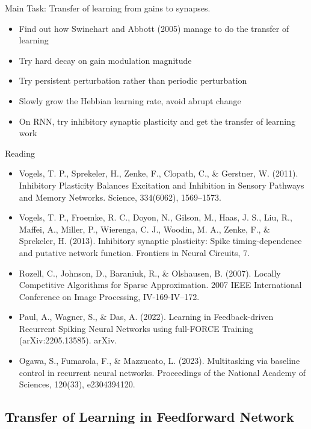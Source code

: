 \documentclass[12pt, a4paper]{article}
\begin{document}
\noindent
Main Task: Transfer of learning from gains to synapses.

\begin{itemize}
    \item Find out how Swinehart and Abbott (2005) manage to do the transfer of learning
    \item Try hard decay on gain modulation magnitude
    \item Try persistent perturbation rather than periodic perturbation
    \item Slowly grow the Hebbian learning rate, avoid abrupt change
    \item On RNN, try inhibitory synaptic plasticity and get the transfer of learning work
\end{itemize}

\noindent
Reading

\begin{itemize}
    \item Vogels, T. P., Sprekeler, H., Zenke, F., Clopath, C., \& Gerstner, W. (2011). Inhibitory Plasticity Balances Excitation and Inhibition in Sensory Pathways and Memory Networks. Science, 334(6062), 1569–1573.
    \item Vogels, T. P., Froemke, R. C., Doyon, N., Gilson, M., Haas, J. S., Liu, R., Maffei, A., Miller, P., Wierenga, C. J., Woodin, M. A., Zenke, F., \& Sprekeler, H. (2013). Inhibitory synaptic plasticity: Spike timing-dependence and putative network function. Frontiers in Neural Circuits, 7.
    \item Rozell, C., Johnson, D., Baraniuk, R., \& Olshausen, B. (2007). Locally Competitive Algorithms for Sparse Approximation. 2007 IEEE International Conference on Image Processing, IV-169-IV–172.
    \item Paul, A., Wagner, S., \& Das, A. (2022). Learning in Feedback-driven Recurrent Spiking Neural Networks using full-FORCE Training (arXiv:2205.13585). arXiv.
    \item Ogawa, S., Fumarola, F., \& Mazzucato, L. (2023). Multitasking via baseline control in recurrent neural networks. Proceedings of the National Academy of Sciences, 120(33), e2304394120.
\end{itemize}

\newpage

\subsection*{Transfer of Learning in Feedforward Network}
\end{document}
